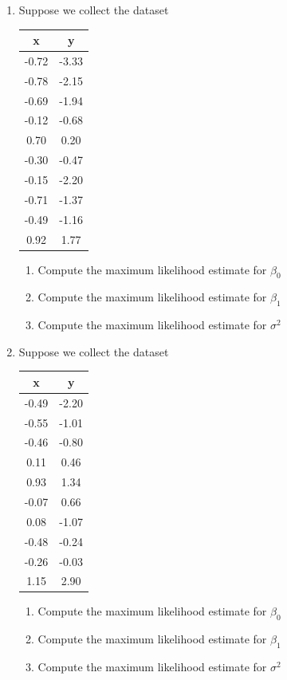 \begin{enumerate}
    \item Suppose we collect the dataset
    \begin{table}[ht!]
        \centering
        \begin{tabular}{c|c}
            x & y \\
            \hline
            -0.72 &  -3.33\\
            -0.78 &  -2.15\\
            -0.69 &  -1.94\\
            -0.12 &  -0.68\\
             0.70 &  0.20\\
            -0.30 &  -0.47\\
            -0.15 &  -2.20\\
            -0.71 &  -1.37\\
            -0.49 &  -1.16\\
             0.92 &  1.77\\
        \end{tabular}
    \end{table}
    \begin{enumerate}
        \item Compute the maximum likelihood estimate for $\beta_{0}$
        \item Compute the maximum likelihood estimate for $\beta_{1}$
        \item Compute the maximum likelihood estimate for $\sigma^{2}$
    \end{enumerate}
    
    \item Suppose we collect the dataset
    \begin{table}[ht!]
        \centering
        \begin{tabular}{c|c}
            x & y \\
            \hline
            -0.49 &  -2.20\\
            -0.55 &  -1.01\\
            -0.46 &  -0.80\\
             0.11 &  0.46\\
             0.93 &  1.34\\
            -0.07 &  0.66\\
             0.08 &  -1.07\\
            -0.48 &  -0.24\\
            -0.26 &  -0.03\\
             1.15 &  2.90\\
        \end{tabular}
    \end{table}
    \begin{enumerate}
        \item Compute the maximum likelihood estimate for $\beta_{0}$
        \item Compute the maximum likelihood estimate for $\beta_{1}$
        \item Compute the maximum likelihood estimate for $\sigma^{2}$
    \end{enumerate}
    
\end{enumerate}





